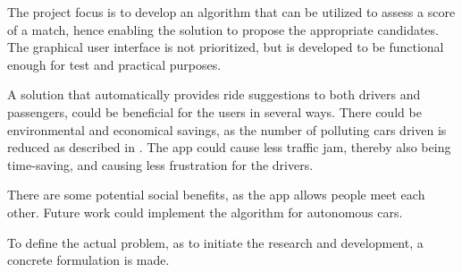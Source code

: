 The project focus is to develop an algorithm that can be utilized to assess a score of a match, hence enabling the solution to propose the appropriate candidates. The graphical user interface is not prioritized, but is developed to be functional enough for test and practical purposes.

A solution that automatically provides ride suggestions to both drivers and passengers, could be beneficial for the users in several ways. There could be environmental and economical savings, as the number of polluting cars driven is reduced as described in \cite{doi:10.1080/01441647.2011.621557}. The app could cause less traffic jam, thereby also being time-saving, and causing less frustration for the drivers.

There are some potential social benefits, as the app allows people meet each other. Future work could implement the algorithm for autonomous cars.

\iffalse
Since employers usually are located in the same area, and commuters could live in the same area, there should be a possibility for the commuters  potentially share cars and thereby reduce traffic.
There are many apps\todo{source and define 'app'} that allow users to request and give rides\todo{define}, but they require active participation of the users to do so. 
\fi



To define the actual problem, as to initiate the research and development, a concrete formulation is made.